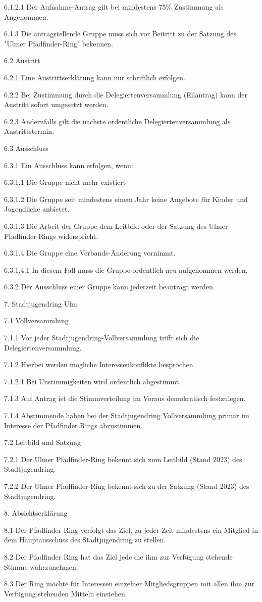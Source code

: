 6.1.2.1 Der Aufnahme-Antrag gilt bei mindestens 75\% Zustimmung als Angenommen.

6.1.3 Die antragstellende Gruppe muss sich vor Beitritt zu der Satzung des "Ulmer Pfadfinder-Ring" bekennen.

6.2 Austritt

6.2.1 Eine Austrittserklärung kann nur schriftlich erfolgen.

6.2.2 Bei Zustimmung durch die Delegiertenversammlung (Eilantrag) kann der Austritt sofort umgesetzt werden.

6.2.3 Andernfalls gilt die nächste ordentliche Delegiertenversammlung als Austrittstermin.

6.3 Ausschluss

6.3.1 Ein Ausschluss kann erfolgen, wenn:

6.3.1.1 Die Gruppe nicht mehr existiert

6.3.1.2 Die Gruppe seit mindestens einem Jahr keine Angebote für Kinder und Jugendliche anbietet.

6.3.1.3 Die Arbeit der Gruppe dem Leitbild oder der Satzung des Ulmer Pfadfinder-Rings widerspricht.

6.3.1.4 Die Gruppe eine Verbands-Änderung vornimmt.

6.3.1.4.1 In diesem Fall muss die Gruppe ordentlich neu aufgenommen werden.

6.3.2 Der Ausschluss einer Gruppe kann jederzeit beantragt werden.

7. Stadtjugendring Ulm

7.1 Vollversammlung

7.1.1 Vor jeder Stadtjugendring-Vollversammlung trifft sich die
Delegiertenversammlung.

7.1.2 Hierbei werden mögliche Interessenkonflikte besprochen.

7.1.2.1 Bei Unstimmigkeiten wird ordentlich abgestimmt.

7.1.3 Auf Antrag ist die Stimmverteilung im Voraus demokratisch festzulegen.

7.1.4 Abstimmende haben bei der Stadtjugendring Vollversammlung primär im Interesse der Pfadfinder Rings abzustimmen.

7.2 Leitbild und Satzung

7.2.1 Der Ulmer Pfadfinder-Ring bekennt sich zum Leitbild (Stand 2023) des Stadtjugendring.

7.2.2 Der Ulmer Pfadfinder-Ring bekennt sich zu der Satzung (Stand 2023) des Stadtjugendring.

8. Absichtserklärung

8.1 Der Pfadfinder Ring verfolgt das Ziel, zu jeder Zeit mindestens ein Mitglied in dem Hauptausschuss des Stadtjugendring zu stellen.

8.2 Der Pfadfinder Ring hat das Ziel jede die ihm zur Verfügung stehende Stimme wahrzunehmen.

8.3 Der Ring möchte für Interessen einzelner Mitgliedsgruppen mit allen ihm zur Verfügung stehenden Mitteln einstehen.
